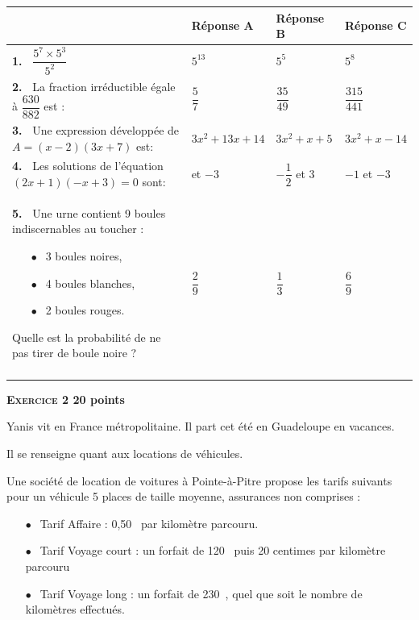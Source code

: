 \documentclass[11pt]{article}
\newcommand{\euro}{\eurologo{}}
\begin{document}
\begin{center}
\renewcommand\arraystretch{2}
\begin{tabularx}{\linewidth}{|m{5cm}|*{3}{>{\centering \arraybackslash}X|}}\cline{2-4}
\multicolumn{1}{c|}{~}&\textbf{Réponse A}&\textbf{Réponse B}&\textbf{Réponse C}\\ \hline
\textbf{1.~} $\dfrac{5^7 \times 5^3}{5^2}$&$5^{13}$&$5^5$&$5^8$\\ \hline
\textbf{2.~} La fraction irréductible égale à $\dfrac{630}{882}$ est :&$\dfrac57$&$\dfrac{35}{49}$&$\dfrac{315}{441}$\\ \hline
\textbf{3.~} Une expression développée de 
$A = (x - 2)(3x + 7)$ est:&$3x^2 +13x +14$&$3x^2 +x +5$&$3x^2 +x -14$\\ \hline\index{développement}
\textbf{4.~} 
Les solutions de l'équation $(2x + 1)(- x + 3) = 0$ sont:&2 et $- 3$&$- \dfrac12$ et 3&$- 1$ et $- 3$\\ \hline\index{équation produit}
\textbf{5.~} 
Une urne contient 9 boules indiscernables au toucher :
\begin{itemize}
\item[$\bullet~~$]3 boules noires,
\item[$\bullet~~$]4 boules blanches,
\item[$\bullet~~$]2 boules rouges.
\end{itemize}

Quelle est la probabilité de ne pas tirer de boule noire ?&$\dfrac29$&$\dfrac13$&$\dfrac69$\\ \hline\index{probabilité}
\end{tabularx}
\renewcommand\arraystretch{1}
\end{center}

\bigskip

\textbf{{\large \textsc{Exercice 2}} \hfill 20 points}

\bigskip

Yanis vit en France métropolitaine. Il part cet été en Guadeloupe en vacances.

Il se renseigne quant aux locations de véhicules.

Une société de location de voitures à Pointe-à-Pitre propose les tarifs suivants pour un véhicule  5 places de taille moyenne,  assurances non comprises :

\begin{itemize}
\item[$\bullet~~$]Tarif \og Affaire \fg{} : 0,50~\euro{} par kilomètre parcouru.
\item[$\bullet~~$]Tarif \og Voyage court \fg{} : un forfait de 120~\euro{} puis 20 centimes par 
kilomètre parcouru
\item[$\bullet~~$]Tarif \og Voyage long \fg : un forfait de 230~\euro, quel que soit le nombre de kilomètres effectués.
\end{itemize}
\end{document}
